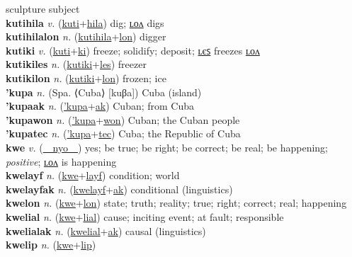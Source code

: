 sculpture subject \label{kutimwonilum} \\
\textbf{kutihila} \textit{v.} (\hyperref[kuti]{kuti}+\hyperref[hila]{hila})
dig; \hyperref[kutihilalon]{ʟᴏᴧ} digs \label{kutihila} \\
\textbf{kutihilalon} \textit{n.} (\hyperref[kutihila]{kutihila}+\hyperref[lon]{lon})
digger \label{kutihilalon} \\
\textbf{kutiki} \textit{v.} (\hyperref[kuti]{kuti}+\hyperref[ki]{ki})
freeze; solidify; deposit; \hyperref[kutikiles]{ʟєꜱ} freezes \hyperref[kutikilon]{ʟᴏᴧ} \label{kutiki} \\
\textbf{kutikiles} \textit{n.} (\hyperref[kutiki]{kutiki}+\hyperref[les]{les})
freezer \label{kutikiles} \\
\textbf{kutikilon} \textit{n.} (\hyperref[kutiki]{kutiki}+\hyperref[lon]{lon})
frozen; ice \label{kutikilon} \\
\textbf{'kupa} \textit{n.} (Spa. ⟨Cuba⟩ [kuβa])
Cuba (island) \label{'kupa} \\
\textbf{'kupaak} \textit{n.} (\hyperref['kupa]{'kupa}+\hyperref[ak]{ak})
Cuban; from Cuba \label{'kupaak} \\
\textbf{'kupawon} \textit{n.} (\hyperref['kupa]{'kupa}+\hyperref[won]{won})
Cuban; the Cuban people \label{'kupawon} \\
\textbf{'kupatec} \textit{n.} (\hyperref['kupa]{'kupa}+\hyperref[tec]{tec})
Cuba; the Republic of Cuba \label{'kupatec} \\
\textbf{kwe} \textit{v.} (\hyperref[nyo]{~~nyo~~})
yes; be true; be right; be correct; be real; be happening; \textit{positive}; \hyperref[kwelon]{ʟᴏᴧ} is happening \label{kwe} \\
\textbf{kwelayf} \textit{n.} (\hyperref[kwe]{kwe}+\hyperref[layf]{layf})
condition; world \label{kwelayf} \\
\textbf{kwelayfak} \textit{n.} (\hyperref[kwelayf]{kwelayf}+\hyperref[ak]{ak})
conditional (linguistics) \label{kwelayfak} \\
\textbf{kwelon} \textit{n.} (\hyperref[kwe]{kwe}+\hyperref[lon]{lon})
state; truth; reality; true; right; correct; real; happening \label{kwelon} \\
\textbf{kwelial} \textit{n.} (\hyperref[kwe]{kwe}+\hyperref[lial]{lial})
cause; inciting event; at fault; responsible \label{kwelial} \\
\textbf{kwelialak} \textit{n.} (\hyperref[kwelial]{kwelial}+\hyperref[ak]{ak})
causal (linguistics) \label{kwelialak} \\
\textbf{kwelip} \textit{n.} (\hyperref[kwe]{kwe}+\hyperref[lip]{lip})
